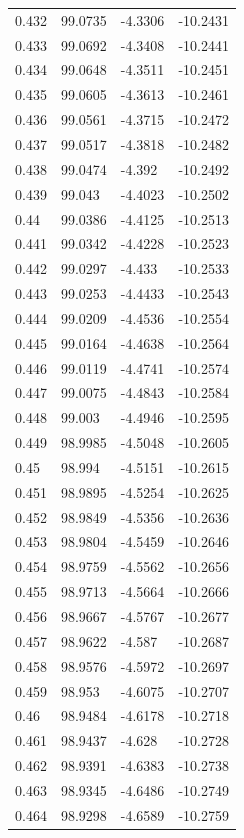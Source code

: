 \begin{tabular}{llll}
0.432 & 99.0735 & -4.3306 & -10.2431 \\
0.433 & 99.0692 & -4.3408 & -10.2441 \\
0.434 & 99.0648 & -4.3511 & -10.2451 \\
0.435 & 99.0605 & -4.3613 & -10.2461 \\
0.436 & 99.0561 & -4.3715 & -10.2472 \\
0.437 & 99.0517 & -4.3818 & -10.2482 \\
0.438 & 99.0474 & -4.392 & -10.2492 \\
0.439 & 99.043 & -4.4023 & -10.2502 \\
0.44 & 99.0386 & -4.4125 & -10.2513 \\
0.441 & 99.0342 & -4.4228 & -10.2523 \\
0.442 & 99.0297 & -4.433 & -10.2533 \\
0.443 & 99.0253 & -4.4433 & -10.2543 \\
0.444 & 99.0209 & -4.4536 & -10.2554 \\
0.445 & 99.0164 & -4.4638 & -10.2564 \\
0.446 & 99.0119 & -4.4741 & -10.2574 \\
0.447 & 99.0075 & -4.4843 & -10.2584 \\
0.448 & 99.003 & -4.4946 & -10.2595 \\
0.449 & 98.9985 & -4.5048 & -10.2605 \\
0.45 & 98.994 & -4.5151 & -10.2615 \\
0.451 & 98.9895 & -4.5254 & -10.2625 \\
0.452 & 98.9849 & -4.5356 & -10.2636 \\
0.453 & 98.9804 & -4.5459 & -10.2646 \\
0.454 & 98.9759 & -4.5562 & -10.2656 \\
0.455 & 98.9713 & -4.5664 & -10.2666 \\
0.456 & 98.9667 & -4.5767 & -10.2677 \\
0.457 & 98.9622 & -4.587 & -10.2687 \\
0.458 & 98.9576 & -4.5972 & -10.2697 \\
0.459 & 98.953 & -4.6075 & -10.2707 \\
0.46 & 98.9484 & -4.6178 & -10.2718 \\
0.461 & 98.9437 & -4.628 & -10.2728 \\
0.462 & 98.9391 & -4.6383 & -10.2738 \\
0.463 & 98.9345 & -4.6486 & -10.2749 \\
0.464 & 98.9298 & -4.6589 & -10.2759 \\

\end{tabular}
